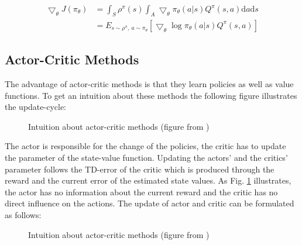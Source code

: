 \begin{align*}
\bigtriangledown_\theta 
J(\pi_\theta)&=\int_{S}^{}\rho^\pi(s)\int_{A}\bigtriangledown_\theta 
\pi_\theta(a|s)Q^\pi(s,a)\mathrm{d}a\mathrm{d}s\\
&=E_{s \sim \rho^\pi,\: a\sim\pi_\theta}[\bigtriangledown_\theta \log 
\pi_\theta (a|s)Q^\pi(s,a)]
\end{align*}%

\subsection{Actor-Critic Methods}
\label{sec:actor-critic}
The advantage of actor-critic methods is that they learn policies as well as 
value functions. To get an intuition about these methods the following figure 
illustrates the update-cycle:
\begin{figure}[H]
	\centering
	\caption{Intuition about actor-critic methods (figure from 
	\cite{sutton2018reinforcement})}
	\label{fig:actor-critic}
\end{figure}
The actor is responsible for the change of the policies, the critic has to 
update the parameter of the state-value function. Updating the actors' and the 
critics' parameter follows the TD-error of the critic which is produced through 
the reward and the current error of the estimated state values. As Fig. 
\ref{fig:actor-critic} illustrates, the actor has no information about the 
current reward and the critic has no direct influence on the actions.  
The update of actor and critic can be formulated as follows:
\begin{figure}[H]
	\centering
	\caption{Intuition about actor-critic methods (figure from 
		\cite{sutton2018reinforcement})}
	\label{fig:actor-critic-algo}
\end{figure}

